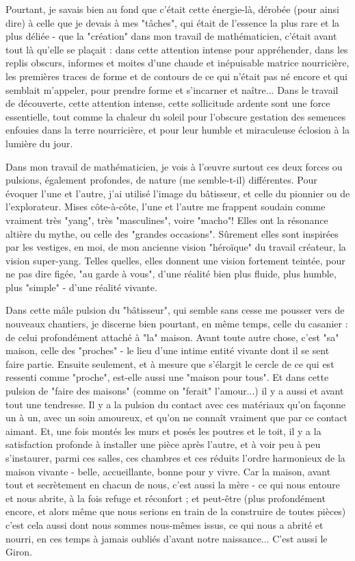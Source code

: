Pourtant, je savais bien au fond que c'était cette énergie-là, dérobée (pour ainsi dire) à celle que je devais à mes "tâches", qui était de l'essence la plus rare et la plus déliée - que la "création" dans mon travail de mathématicien, c'était avant tout là qu'elle se plaçait : dans cette attention intense pour appréhender, dans les replis obscurs, informes et moites d'une chaude et inépuisable matrice nourricière, les premières traces de forme et de contours de ce qui n'était pas né encore et qui semblait m'appeler, pour prendre forme et s'incarner et naître... Dans le travail de découverte, cette attention intense, cette sollicitude ardente sont une force essentielle, tout comme la chaleur du soleil pour l'obscure gestation des semences enfouies dans la terre nourricière, et pour leur humble et miraculeuse éclosion à la lumière du jour.

Dans mon travail de mathématicien, je vois à l'œuvre surtout ces deux forces ou pulsions, également profondes, de nature (me semble-t-il) différentes. Pour évoquer l'une et l'autre, j'ai utilisé l'image du bâtisseur, et celle du pionnier ou de l'explorateur. Mises côte-à-côte, l'une et l'autre me frappent soudain comme vraiment très "yang", très "masculines", voire "macho"! Elles ont la résonance altière du mythe, ou celle des "grandes occasions". Sûrement elles sont inspirées par les vestiges, en moi, de mon ancienne vision "héroïque" du travail créateur, la vision super-yang. Telles quelles, elles donnent une vision fortement teintée, pour ne pas dire figée, "au garde à vous", d'une réalité bien plus fluide, plus humble, plus "simple" - d'une réalité vivante.

Dans cette mâle pulsion du "bâtisseur", qui semble sans cesse me pousser vers de nouveaux chantiers, je discerne bien pourtant, en même temps, celle du casanier : de celui profondément attaché à "la" maison. Avant toute autre chose, c'est "sa" maison, celle des "proches" - le lieu d'une intime entité vivante dont il se sent faire partie. Ensuite seulement, et à mesure que s'élargit le cercle de ce qui est ressenti comme "proche", est-elle aussi une "maison pour tous". Et dans cette pulsion de "faire des maisons" (comme on "ferait" l'amour...) il y a aussi et avant tout une tendresse. Il y a la pulsion du contact avec ces matériaux qu'on façonne un à un, avec un soin amoureux, et qu'on ne connaît vraiment que par ce contact aimant. Et, une fois montés les murs et posés les poutres et le toit, il y a la satisfaction profonde à installer une pièce après l'autre, et à voir peu à peu s'instaurer, parmi ces salles, ces chambres et ces réduits l'ordre harmonieux de la maison vivante - belle, accueillante, bonne pour y vivre. Car la maison, avant tout et secrètement en chacun de nous, c'est aussi la mère - ce qui nous entoure et nous abrite, à la fois refuge et réconfort ; et peut-être (plus profondément encore, et alors même que nous serions en train de la construire de toutes pièces) c'est cela aussi dont nous sommes nous-mêmes issus, ce qui nous a abrité et nourri, en ces temps à jamais oubliés d'avant notre naissance... C'est aussi le Giron.

